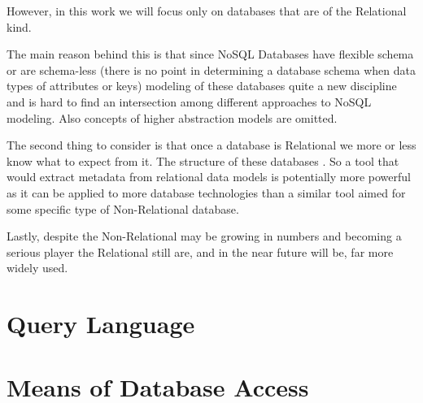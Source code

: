 
However, in this work we will focus only on databases that are of the Relational kind. 

The main reason behind this is that since NoSQL Databases have flexible schema or are schema-less (there is no point in determining a database schema when data types of attributes or keys) modeling of these databases quite a new discipline and is hard to find an intersection among different approaches to NoSQL modeling.
Also concepts of higher abstraction models are omitted. \cite{NoSQLDatabaseModeling}

The second thing to consider is that once a database is Relational we more or less know what to expect from it. The structure of these databases . So a tool that would extract metadata from relational data models is potentially more powerful as it can be applied to more database technologies than a similar tool aimed for some specific type of Non-Relational database. 

Lastly, despite the Non-Relational may be growing in numbers and becoming a serious player the Relational still are, and in the near future will be, far more widely used.

\section{Query Language}

\section{Means of Database Access}
